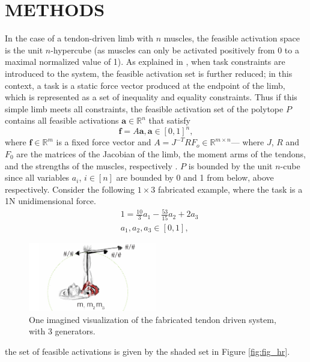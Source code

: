 \section{METHODS}
In the case of a tendon-driven limb with $n$ muscles, the feasible activation space is the unit $n$-hypercube (as muscles can only be activated positively from 0 to a maximal normalized value of 1). As explained in \cite{Valero-Cuevas2009mathematical}, when task constraints are introduced to the system, the feasible activation set is further reduced; in this context, a task is a static force vector produced at the endpoint of the limb, which is represented as a set of inequality and equality constraints. Thus if this simple limb meets all constraints, the feasible activation set of the polytope $P$ contains all feasible activations  $\textbf{a} \in \mathbb{R}^n$ that satisfy
\[\textbf{f} = A\textbf{a}, \textbf{a} \in [0,1]^n,\]
where $\textbf{f} \in \mathbb{R}^m$ is a fixed force vector and $A = J^{-T}RF_o \in \mathbb{R}^{m \times n}$--- where $J$, $R$ and $F_0$ are the matrices of the Jacobian of the limb, the moment arms of the tendons, and the strengths of the muscles, respectively \cite{Valero-Cuevas1998Large,Valero-Cuevas2009mathematical}. $P$ is bounded by the unit $n$-cube since all variables $a_i$, $i \in [n]$ are bounded by 0 and 1 from below, above respectively.
Consider the following $1 \times 3$ fabricated example, where the task is a 1N unidimensional force.
\begin{align*}
&1 = \frac{10}{3}a_1 - \frac{53}{15}a_2 + 2a_3 \\
&a_1, a_2, a_3 \in [0,1],
\end{align*}



\begin{figure}[schematic_arm]
  \label{fig:schematic_arm}
  \centering
  \includegraphics[width=0.5\textwidth]{sections/figs/schematic_example_drawing.pdf}
  \caption{One imagined visualization of the fabricated tendon driven system, with 3 generators.}
  \label{fig:finger}
\end{figure}


the set of feasible activations is given by the shaded set in Figure \ref{fig:fig_hr}.

